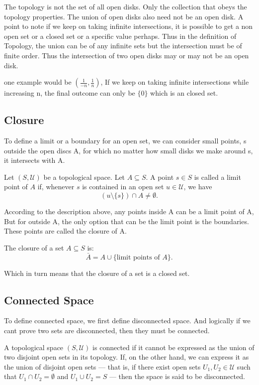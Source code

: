 \documentclass{article}
\begin{document}
The topology is not the set of all open disks. Only the collection that obeys the topology properties. The union of open disks also need not be an open disk. A point to note if we keep on taking infinite intersections, it is possible to get a non open set or a closed set or a specific value perhaps. Thus in the definition of Topology, the union can be of any infinite sets but the intersection must be of finite order. Thus the intersection of two open disks may or may not be an open disk. 

one example would be $  ( \frac{1}{-n}, \frac{1}{n} ) $, If we keep on taking infinite intersections while increasing n, the final outcome can only be $ \{ 0 \} $ which is an closed set. 

\subsection{Closure}
To define a limit or a boundary for an open set, we can consider small points, s outside the open discs A, for which no matter how small disks we make around s, it intersects with A. 

\begin{theorem}
    Let $(S, \mathcal{U})$ be a topological space. Let $A \subseteq S$. A point $s \in S$ is called a limit point of $A$ if, whenever $s$ is contained in an open set $u \in \mathcal{U}$, we have
\[
(u \setminus \{s\}) \cap A \neq \emptyset.
\]
\end{theorem}

According to the description above, any points inside A can be a limit point of A, But for outside A, the only option that can be the limit point is the boundaries. These points are called the closure of A. 

\begin{theorem}
The closure of a set $A \subseteq S$ is:
\[
\bar{A} = A \cup \{ \text{limit points of } A \}.
\]
\end{theorem}

Which in turn means that the closure of a set is a closed set. 

\subsection{Connected Space}

To define connected space, we first define disconnected space. And logically if we cant prove two sets are disconnected, then they must be connected.  

\begin{theorem}
 A topological space $(S, \mathcal{U})$ is connected if it cannot be expressed as the union of two disjoint open sets in its topology. If, on the other hand, we can express it as the union of disjoint open sets — that is, if there exist open sets $U_1, U_2 \in \mathcal{U}$ such that $U_1 \cap U_2 = \emptyset$ and $U_1 \cup U_2 = S$ — then the space is said to be disconnected.
\end{theorem}
\end{document}
